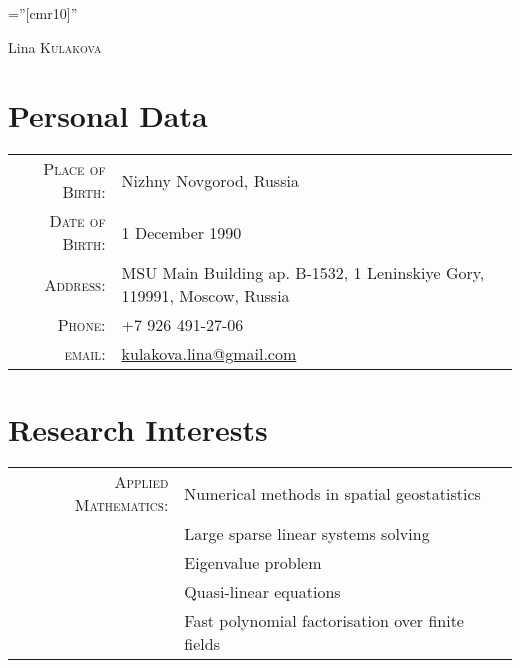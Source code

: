 \documentclass[a4paper,10pt]{article}
\begin{document}
\pagestyle{empty} %

\font\fb=''[cmr10]'' %

\par{%
		{\Huge Lina \textsc{Kulakova}
	}\bigskip\par}

	
\section{Personal Data}

\begin{tabular}{rl}
    \textsc{Place of Birth:} & Nizhny Novgorod, Russia \\
    \textsc{Date of Birth:} & 1 December 1990 \\
    \textsc{Address:}   & MSU Main Building ap. B-1532, 1 Leninskiye Gory, 119991, Moscow, Russia \\
    \textsc{Phone:}     & +7 926 491-27-06\\
    \textsc{email:}     & \href{mailto:kulakova.lina@gmail.com}{kulakova.lina@gmail.com}
\end{tabular}

\section{Research Interests}
\begin{tabular}{rp{13cm}}

\textsc{Applied Mathematics:} & Numerical methods in spatial geostatistics \\
& Large sparse linear systems solving \\
& Eigenvalue problem \\
& Quasi-linear equations\\
& Fast polynomial factorisation over finite fields  \\
\end{tabular}


\end{document}
